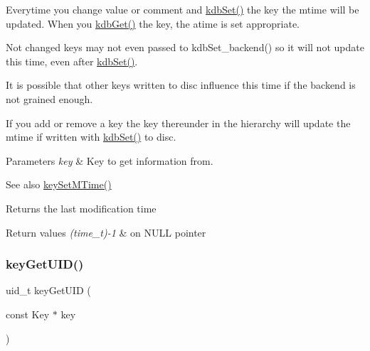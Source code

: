 Everytime you change value or comment and \mbox{\hyperlink{group__kdb_ga11436b058408f83d303ca5e996832bcf}{kdb\+Set()}} the key the mtime will be updated. When you \mbox{\hyperlink{group__kdb_ga28e385fd9cb7ccfe0b2f1ed2f62453a1}{kdb\+Get()}} the key, the atime is set appropriate.

Not changed keys may not even passed to kdb\+Set\+\_\+backend() so it will not update this time, even after \mbox{\hyperlink{group__kdb_ga11436b058408f83d303ca5e996832bcf}{kdb\+Set()}}.

It is possible that other keys written to disc influence this time if the backend is not grained enough.

If you add or remove a key the key thereunder in the hierarchy will update the mtime if written with \mbox{\hyperlink{group__kdb_ga11436b058408f83d303ca5e996832bcf}{kdb\+Set()}} to disc.


\begin{DoxyParams}{Parameters}
{\em key} & Key to get information from. \\
\hline
\end{DoxyParams}
\begin{DoxySeeAlso}{See also}
\mbox{\hyperlink{group__meta_ga481d8997187992fe4bbf288bc8ef4db7}{key\+Set\+M\+Time()}} 
\end{DoxySeeAlso}
\begin{DoxyReturn}{Returns}
the last modification time 
\end{DoxyReturn}

\begin{DoxyRetVals}{Return values}
{\em (time\+\_\+t)-\/1} & on N\+U\+LL pointer \\
\hline
\end{DoxyRetVals}
\mbox{\label{group__meta_gacaa5060e67b03f50ae49a3620c54bc46}} 
\subsubsection{\texorpdfstring{keyGetUID()}{keyGetUID()}}
{\footnotesize\ttfamily uid\+\_\+t key\+Get\+U\+ID (\begin{DoxyParamCaption}\item[{const Key $\ast$}]{key }\end{DoxyParamCaption})}



